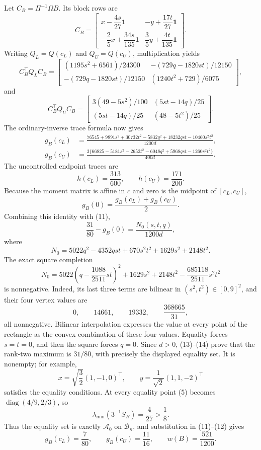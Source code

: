 Let \(C_B=\Pi^{-1}\Omega B\).  Its block rows are
\[
C_B=
\begin{bmatrix}
x-\dfrac{4s}{27}\mathbf1&-y+\dfrac{17t}{27}\mathbf1\\[3pt]
-\dfrac25x+\dfrac{34s}{135}\mathbf1&\dfrac35y+\dfrac{4t}{135}\mathbf1
\end{bmatrix}.
\tag{8}
\]
Writing \(Q_L=Q(c_L)\) and \(Q_U=Q(c_U)\), multiplication yields
\[
C_B^{\top}Q_LC_B=
\begin{bmatrix}
(1195s^2+6561)/24300&-(729q-1820st)/12150\\
-(729q-1820st)/12150&(1240t^2+729)/6075
\end{bmatrix},
\tag{9}
\]
and
\[
C_B^{\top}Q_UC_B=
\begin{bmatrix}
3(49-5s^2)/100&(5st-14q)/25\\
(5st-14q)/25&(48-5t^2)/25
\end{bmatrix}.
\tag{10}
\]
The ordinary-inverse trace formula now gives
\[
\begin{split}
g_B(c_L)
&=\frac{76545+9891s^2+30732t^2-5832q^2+18232qst-10460s^2t^2}{1200d},\\
g_B(c_U)
&=\frac{3\{66825-5181s^2-2652t^2-6048q^2+5968qst-1260s^2t^2\}}{400d}.
\end{split}
\tag{11}
\]
The uncontrolled endpoint traces are
\[
h(c_L)=\frac{313}{600},
\qquad h(c_U)=\frac{171}{200}.
\tag{12}
\]
Because the moment matrix is affine in \(c\) and zero is the midpoint of \([c_L,c_U]\),
\[
g_B(0)=\frac{g_B(c_L)+g_B(c_U)}2.
\]
Combining this identity with (11),
\[
\frac{31}{80}-g_B(0)=\frac{N_0(s,t,q)}{1200d},
\tag{13}
\]
where
\[
N_0=5022q^2-4352qst+670s^2t^2+1629s^2+2148t^2.
\]
The exact square completion
\[
N_0
=5022\left(q-\frac{1088}{2511}st\right)^2
+1629s^2+2148t^2-\frac{685118}{2511}s^2t^2
\tag{14}
\]
is nonnegative.  Indeed, its last three terms are bilinear in \((s^2,t^2)\in[0,9]^2\), and their four vertex values are
\[
0,
\qquad14661,
\qquad19332,
\qquad\frac{368665}{31},
\]
all nonnegative.  Bilinear interpolation expresses the value at every point of the rectangle as the convex combination of these four values.  Equality forces \(s=t=0\), and then the square forces \(q=0\).  Since \(d>0\), (13)--(14) prove that the rank-two maximum is \(31/80\), with precisely the displayed equality set.  It is nonempty; for example,
\[
x=\sqrt{\frac32}(1,-1,0)^{\top},
\qquad
y=\frac1{\sqrt2}(1,1,-2)^{\top}
\]
satisfies the equality conditions.  At every equality point (5) becomes \(\operatorname{diag}(4/9,2/3)\), so
\[
\lambda_{\min}(3^{-1}S_B)=\frac4{27}>\frac18.
\tag{15}
\]
Thus the equality set is exactly \(\mathcal A_0\) on \(\mathcal B_\kappa\), and substitution in (11)--(12) gives
\[
g_B(c_L)=\frac7{80},
\qquad
g_B(c_U)=\frac{11}{16},
\qquad
w(B)=\frac{521}{1200}.
\tag{16}
\]


